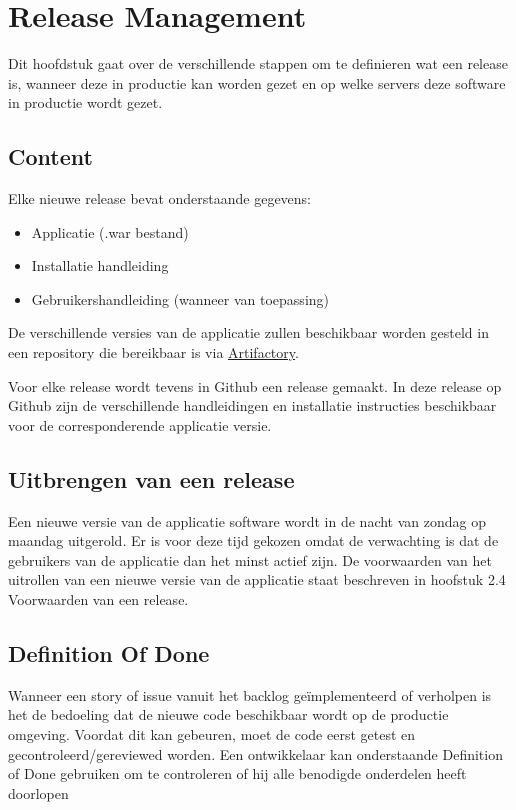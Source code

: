 \chapter{Release Management}
Dit hoofdstuk gaat over de verschillende stappen om te definieren wat een release is, wanneer deze in productie kan worden gezet en op welke servers deze software in productie wordt gezet.

\section{Content}
Elke nieuwe release bevat onderstaande gegevens:

\begin{itemize}
	\item Applicatie (.war bestand)
	\item Installatie handleiding
	\item Gebruikershandleiding (wanneer van toepassing)	
\end{itemize}

De verschillende versies van de applicatie zullen beschikbaar worden gesteld in een repository die bereikbaar is via \href{85.144.215.28:8082}{Artifactory}.

Voor elke release wordt tevens in Github een release gemaakt. In deze release op Github zijn de verschillende handleidingen en installatie instructies beschikbaar voor de corresponderende applicatie versie.

\section{Uitbrengen van een release}
Een nieuwe versie van de applicatie software wordt in de nacht van zondag op maandag uitgerold. Er is voor deze tijd gekozen omdat de verwachting is dat de gebruikers van de applicatie dan het minst actief zijn. De voorwaarden van het uitrollen van een nieuwe versie van de applicatie staat beschreven in hoofstuk 2.4 Voorwaarden van een release.

\section{Definition Of Done}
Wanneer een story of issue vanuit het backlog geïmplementeerd of verholpen is het de bedoeling dat de nieuwe code beschikbaar wordt op de productie omgeving. Voordat dit kan gebeuren, moet de code eerst getest en gecontroleerd/gereviewed worden. Een ontwikkelaar kan onderstaande Definition of Done gebruiken om te controleren of hij alle benodigde onderdelen heeft doorlopen
	
